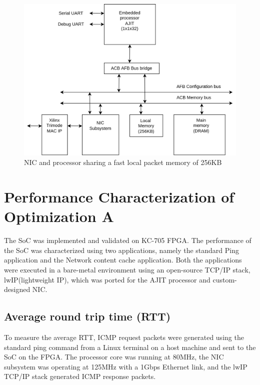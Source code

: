 \documentclass[12pt]{report}
\begin{document}
	\begin{figure}[h]
			\centering
			\includegraphics[width=14cm]{../figures/ACB_SRAM_arch.jpg}
			\caption{NIC and processor sharing a fast local packet memory of 256KB}
			\label{fig:NIC-Proc-top-level2}
		\end{figure}
\section{Performance Characterization of Optimization A}
The SoC was implemented and validated on KC-705 FPGA.
The performance of the SoC was characterized using two applications, namely the standard Ping application and the Network content cache application. Both the applications were executed in a bare-metal environment using an open-source TCP/IP stack, lwIP(lightweight IP), which was ported for the AJIT processor and custom-designed NIC. 

\subsection{Average round trip time (RTT)}
To measure the average RTT, ICMP request packets were generated using the standard ping command from a Linux terminal on a host machine and sent to the SoC on the FPGA. The processor core was running at 80MHz, the NIC subsystem was operating at 125MHz with a 1Gbps Ethernet link, and the lwIP TCP/IP stack generated ICMP response packets.
\end{document}
